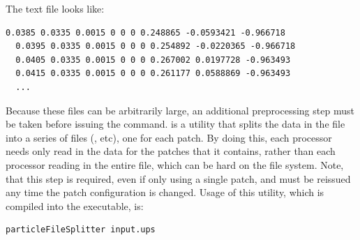   The text file  looks like:
  \begin{lstlisting}[backgroundcolor=\color{background}]
  0.0385 0.0335 0.0015 0 0 0 0.248865 -0.0593421 -0.966718
  0.0395 0.0335 0.0015 0 0 0 0.254892 -0.0220365 -0.966718
  0.0405 0.0335 0.0015 0 0 0 0.267002 0.0197728 -0.963493
  0.0415 0.0335 0.0015 0 0 0 0.261177 0.0588869 -0.963493
  ...
  \end{lstlisting}
  Because these files can be arbitrarily large, an additional preprocessing step
  must be taken before issuing the  command.
   is a utility that splits the
  data in the  file into a series of files
  (, etc), one for each
  patch.  By doing this, each processor needs only read in the data for the
  patches that it contains, rather than each processor reading in the entire file,
  which can be hard on the file system.  Note, that this step is required,
  even if only using a single patch, and must be reissued any time the patch
  configuration is changed.  Usage of this utility, which is compiled
  into the  executable, is:
  \begin{lstlisting}[backgroundcolor=\color{background}]
     particleFileSplitter input.ups
  \end{lstlisting}

